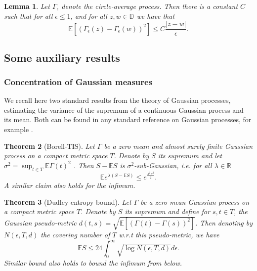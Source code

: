 \documentclass[11pt]{amsart}
\newtheorem{thm}{Theorem}[section]
\newtheorem{lemma}[thm]{Lemma}
\newcommand{\R}{\mathbb R}
\newcommand{\D}{\mathbb D}
\newcommand{\E}{\mathbb E}
\renewcommand{\P}{\mathbb P}
\renewcommand{\1}{\mathbf 1}
\newcommand{\eps}{\epsilon}
\begin{document}
\begin{lemma}\label{lem:ca}
Let $\Gamma_\eps$ denote the circle-average process. Then there is a constant $C$ such that for all $\eps \leq 1$, and for all $z,w \in \D$ we have that
$$\E\left[(\Gamma_\eps(z) - \Gamma_\eps(w))^2\right] \leq C\frac{|z-w|}{\eps}.$$
\end{lemma}




\subsection{Some auxiliary results}

\subsubsection{Concentration of Gaussian measures}
We recall here two standard results from the theory of Gaussian processes, estimating the variance of the supremum of a continuous Gaussian process and its mean. Both can be found in any standard reference on Gaussian processes, for example \cite{Adler}.

\begin{thm}[Borell-TIS]\label{thm:TIS}
Let $\Gamma$ be a zero mean and almost surely finite Gaussian process on a compact metric space $T$. Denote by $S$ its supremum and let $\sigma^2 = \sup_{t \in T} \E \Gamma(t)^2$ . Then $S -\E S$ is $\sigma^2$-sub-Gaussian, i.e. for all $\lambda \in \R$
$$\E e^{\lambda (S - \E S)} \leq e^{\frac{\lambda^2\sigma^2}{2}}.$$
A similar claim also holds for the infimum.
\end{thm}

\begin{thm}[Dudley entropy bound]\label{thm:Dudley}
Let $\Gamma$ be a zero mean Gaussian process on a compact metric space $T$. Denote by $S$ its supremum and define for $s,t \in T$, the Gaussian pseudo-metric $d(t,s) = \sqrt{\E\left[(\Gamma(t) - \Gamma(s))^2\right]}$. Then denoting by $N(\eps, T, d)$ the covering number of $T$ w.r.t this pseudo-metric, we have 
$$\E S \leq 24\int_0^\infty \sqrt{\log N(\eps,T,d)}d\eps.$$
Similar bound also holds to bound the infimum from below.
\end{thm}
\end{document}
